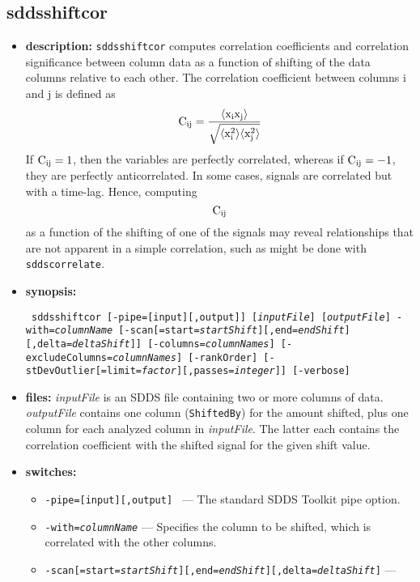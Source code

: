 \begin{latexonly}
\newpage
\end{latexonly}
\subsection{sddsshiftcor}
\label{sddsshiftcor}

\begin{itemize}
\item {\bf description:} 
{\tt sddsshiftcor} computes correlation coefficients and correlation
significance between column data as a function of shifting of the data columns
relative to each other.  The correlation coefficient between
columns i and j is defined as
\[ {\rm C_{ij} = \frac{\langle x_i x_j \rangle}{\sqrt{\langle x_i^2\rangle\langle x_j^2 \rangle}}} \]
If ${\rm C_{ij}=1}$, then the variables are perfectly correlated, whereas if ${\rm C_{ij}=-1}$, they
are perfectly anticorrelated.
In some cases, signals are correlated but with a time-lag.  Hence, computing \[ {\rm C_{ij}} \]
as a function of the shifting of one of the signals may reveal relationships that are not
apparent in a simple correlation, such as might be done with {\tt sddscorrelate}.
\item {\bf synopsis:}
\begin{flushleft}{\tt
sddsshiftcor [-pipe=[input][,output]] [{\em inputFile}] [{\em outputFile}] 
-with={\em columnName} 
[-scan[=start={\em startShift}][,end={\em endShift}][,delta={\em deltaShift}]]
[-columns={\em columnNames}] [-excludeColumns={\em columnNames}] 
[-rankOrder] [-stDevOutlier[=limit={\em factor}][,passes={\em integer}]]
[-verbose]
}\end{flushleft}
\item {\bf files:}
        {\em inputFile} is an SDDS file containing two or more columns of data.  {\em outputFile}
        contains one column ({\tt ShiftedBy}) for the amount shifted, plus one column for
        each analyzed column in {\em inputFile}.  The latter each contains the correlation
        coefficient with the shifted signal for the given shift value.
\item {\bf switches:}
    \begin{itemize}
    \item {\tt -pipe=[input][,output] } --- The standard SDDS Toolkit pipe option.
    \item {\tt -with={\em columnName}} --- Specifies the column to be shifted, which is correlated
        with the other columns.
    \item {\tt -scan[=start={\em startShift}][,end={\em endShift}][,delta={\em deltaShift}]} --- 

\end{itemize}
\end{itemize}
